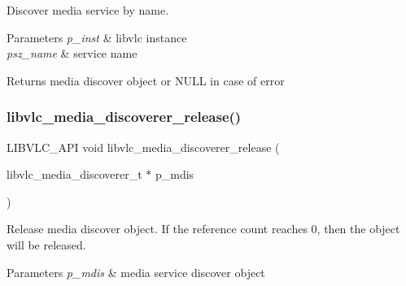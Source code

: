 Discover media service by name.


\begin{DoxyParams}{Parameters}
{\em p\+\_\+inst} & libvlc instance \\
\hline
{\em psz\+\_\+name} & service name \\
\hline
\end{DoxyParams}
\begin{DoxyReturn}{Returns}
media discover object or N\+U\+LL in case of error 
\end{DoxyReturn}
\mbox{\label{group__libvlc__media__discoverer_ga44bb5d3112f1844c420660ac50f03e1b}} 
\subsubsection{\texorpdfstring{libvlc\+\_\+media\+\_\+discoverer\+\_\+release()}{libvlc\_media\_discoverer\_release()}}
{\footnotesize\ttfamily L\+I\+B\+V\+L\+C\+\_\+\+A\+PI void libvlc\+\_\+media\+\_\+discoverer\+\_\+release (\begin{DoxyParamCaption}\item[{libvlc\+\_\+media\+\_\+discoverer\+\_\+t $\ast$}]{p\+\_\+mdis }\end{DoxyParamCaption})}

Release media discover object. If the reference count reaches 0, then the object will be released.


\begin{DoxyParams}{Parameters}
{\em p\+\_\+mdis} & media service discover object \\
\hline
\end{DoxyParams}
